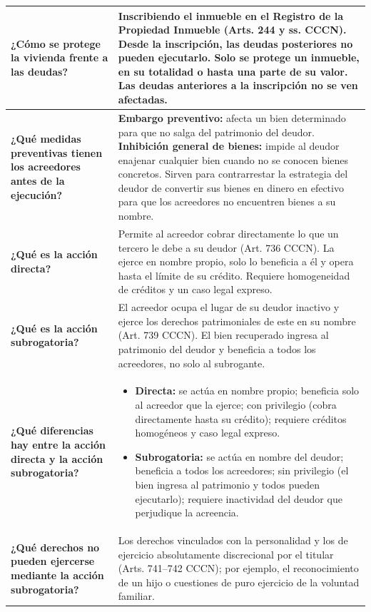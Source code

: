 \documentclass[12pt,oneside]{book}
\newcommand{\cornellpregunta}[2]{\textbf{#1} & #2 \\ \hline}
\begin{document}
\begin{longtable}{|Q|Z|}
\cornellpregunta{¿Cómo se protege la vivienda frente a las deudas?}{%
Inscribiendo el inmueble en el Registro de la Propiedad Inmueble (Arts. 244 y ss. CCCN). Desde la inscripción, las deudas posteriores no pueden ejecutarlo. Solo se protege un inmueble, en su totalidad o hasta una parte de su valor. Las deudas anteriores a la inscripción no se ven afectadas.}

\cornellpregunta{¿Qué medidas preventivas tienen los acreedores antes de la ejecución?}{%
\textbf{Embargo preventivo:} afecta un bien determinado para que no salga del patrimonio del deudor. \textbf{Inhibición general de bienes:} impide al deudor enajenar cualquier bien cuando no se conocen bienes concretos. Sirven para contrarrestar la estrategia del deudor de convertir sus bienes en dinero en efectivo para que los acreedores no encuentren bienes a su nombre.}

\cornellpregunta{¿Qué es la acción directa?}{%
Permite al acreedor cobrar directamente lo que un tercero le debe a su deudor (Art. 736 CCCN). La ejerce en nombre propio, solo lo beneficia a él y opera hasta el límite de su crédito. Requiere homogeneidad de créditos y un caso legal expreso.}

\cornellpregunta{¿Qué es la acción subrogatoria?}{%
El acreedor ocupa el lugar de su deudor inactivo y ejerce los derechos patrimoniales de este en su nombre (Art. 739 CCCN). El bien recuperado ingresa al patrimonio del deudor y beneficia a todos los acreedores, no solo al subrogante.}

\cornellpregunta{¿Qué diferencias hay entre la acción directa y la acción subrogatoria?}{%
\begin{itemize}[nosep,leftmargin=1.2em]
\item \textbf{Directa:} se actúa en nombre propio; beneficia solo al acreedor que la ejerce; con privilegio (cobra directamente hasta su crédito); requiere créditos homogéneos y caso legal expreso.
\item \textbf{Subrogatoria:} se actúa en nombre del deudor; beneficia a todos los acreedores; sin privilegio (el bien ingresa al patrimonio y todos pueden ejecutarlo); requiere inactividad del deudor que perjudique la acreencia.
\end{itemize}}

\cornellpregunta{¿Qué derechos no pueden ejercerse mediante la acción subrogatoria?}{%
Los derechos vinculados con la personalidad y los de ejercicio absolutamente discrecional por el titular (Arts. 741--742 CCCN); por ejemplo, el reconocimiento de un hijo o cuestiones de puro ejercicio de la voluntad familiar.}


\end{longtable}
\end{document}
